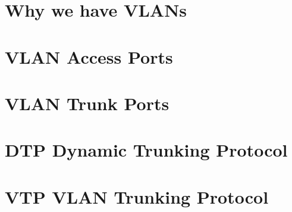 \documentclass[pdflatex,compress,mathserif]{beamer}
\begin{document}
\section{Why we have VLANs}

\section{VLAN Access Ports}

\section{VLAN Trunk Ports}

\section{DTP Dynamic Trunking Protocol}

\section{VTP VLAN Trunking Protocol}
\end{document}
